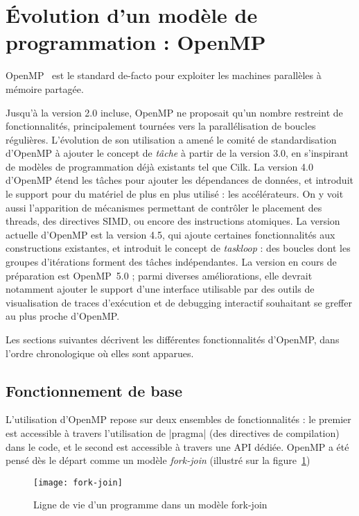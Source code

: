 \section{Évolution d'un modèle de programmation : OpenMP}\label{sec:context:openmp}

OpenMP~\cite{openmp45} est le standard de-facto pour exploiter les machines parallèles à mémoire partagée.

Jusqu'à la version 2.0 incluse, OpenMP ne proposait qu'un nombre restreint de fonctionnalités, principalement tournées vers la parallélisation de boucles régulières.
L'évolution de son utilisation a amené le comité de standardisation d'OpenMP à ajouter le concept de \emph{tâche} à partir de la version 3.0, en s'inspirant de modèles de programmation déjà existants tel que Cilk.
La version 4.0 d'OpenMP étend les tâches pour ajouter les dépendances de données, et introduit le support pour du matériel de plus en plus utilisé : les accélérateurs.
On y voit aussi l'apparition de mécanismes permettant de contrôler le placement des threads, des directives SIMD, ou encore des instructions atomiques.
La version actuelle d'OpenMP est la version 4.5, qui ajoute certaines fonctionnalités aux constructions existantes, et introduit le concept de \emph{taskloop} : des boucles dont les groupes d'itérations forment des tâches indépendantes.
La version en cours de préparation est OpenMP~5.0 ; parmi diverses améliorations, elle devrait notamment ajouter le support d'une interface utilisable par des outils de visualisation de traces d'exécution et de debugging interactif souhaitant se greffer au plus proche d'OpenMP.

Les sections suivantes décrivent les différentes fonctionnalités d'OpenMP, dans l'ordre chronologique où elles sont apparues.

\subsection{Fonctionnement de base}



L'utilisation d'OpenMP repose sur deux ensembles de fonctionnalités : le premier est accessible à travers l'utilisation de |pragma| (des directives de compilation) dans le code, et le second est accessible à travers une API dédiée.
OpenMP a été pensé dès le départ comme un modèle \emph{fork-join} (illustré sur la figure~\ref{fig:context:fork-join})

\begin{figure}[ht]
  \centering
  \texttt{[image: fork-join]}
  \caption{Ligne de vie d'un programme dans un modèle fork-join}\label{fig:context:fork-join}
\end{figure}

